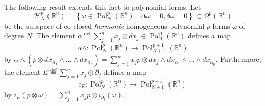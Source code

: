 \documentclass[a4paper,12pt,reqno]{amsart}
\numberwithin{theorem}{subsection}
\numberwithin{equation}{section}
\begin{document}
The following result extends this fact to polynomial forms. Let
$$
   {\mathcal H}^p_N({\mathbb{R}}^n) = \left\{ \omega \in {\operatorname{Pol}}^p_N({\mathbb{R}}^n) \; |\; \Delta \omega = 0,
   \delta \omega = 0 \right\} \subset \Omega^p({\mathbb{R}}^n)
$$
be the subspace of co-closed {\em harmonic} homogeneous polynomial $p$-forms
$\omega$ of degree $N$. The element $\alpha {\stackrel{\text{def}}{=}} \sum_{j=1}^n x_j \otimes dx_j
\in {\operatorname{Pol}}_1^1({\mathbb{R}}^n)$ defines a map
$$
   \alpha \wedge: {\operatorname{Pol}}^p_N({\mathbb{R}}^n) \to {\operatorname{Pol}}^{p+1}_{N+1}({\mathbb{R}}^n)
$$
by $ \alpha \wedge (p \otimes dx_{\alpha_1} \wedge \dots \wedge dx_{\alpha_p})
= \sum_{j=1}^n x_j p \otimes dx_j \wedge dx_{\alpha_1} \wedge \dots \wedge
dx_{\alpha_p}$. Furthermore, the element $E {\stackrel{\text{def}}{=}} \sum_{j=1}^n x_j \otimes
\partial_j$ defines a map
$$
   i_E: {\operatorname{Pol}}^p_N({\mathbb{R}}^n) \to {\operatorname{Pol}}^{p-1}_{N+1}({\mathbb{R}}^n)
$$
by $i_E(p \otimes \omega) = \sum_{j=1}^n x_j p \otimes i_{\partial_j}(\omega)$.
\end{document}
